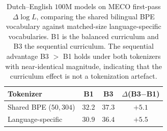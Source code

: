 \begin{table}[t]
\centering
\small
\begin{tabular}{lccc}
\toprule
Tokenizer & B1 & B3 & $\Delta$(B3$-$B1) \\
\midrule
Shared BPE ($50{,}304$)   & $32.2$ & $37.3$ & $+5.1$ \\
Language-specific         & $30.9$ & $36.4$ & $+5.5$ \\
\bottomrule
\end{tabular}
\caption{Dutch--English $100$M models on MECO first-pass $\Delta\log L$, comparing the shared bilingual BPE vocabulary against matched-size language-specific vocabularies. B1 is the balanced curriculum and B3 the sequential curriculum. The sequential advantage B3 $>$ B1 holds under both tokenizers with near-identical magnitude, indicating that the curriculum effect is not a tokenization artefact.}
\label{tab:tokenizer-ablation}
\end{table}
